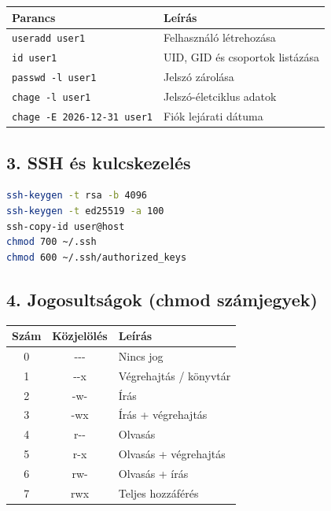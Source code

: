\documentclass[12pt,a4paper]{article}
\begin{document}
\begin{table}[H]
  \centering
  \small
  \begin{tabular}{|l|l|}
    \hline
    \textbf{Parancs} & \textbf{Leírás} \\
    \hline
    \texttt{useradd user1} & Felhasználó létrehozása \\\hline
    \texttt{id user1} & UID, GID és csoportok listázása \\\hline
    \texttt{passwd -l user1} & Jelszó zárolása \\\hline
    \texttt{chage -l user1} & Jelszó-életciklus adatok \\\hline
    \texttt{chage -E 2026-12-31 user1} & Fiók lejárati dátuma \\\hline
  \end{tabular}
\end{table}

\subsection{3. SSH és kulcskezelés}

\begin{lstlisting}[language=bash,caption={SSH kulcskezelés}]
ssh-keygen -t rsa -b 4096
ssh-keygen -t ed25519 -a 100
ssh-copy-id user@host
chmod 700 ~/.ssh
chmod 600 ~/.ssh/authorized_keys
\end{lstlisting}

\subsection{4. Jogosultságok (chmod számjegyek)}

\begin{table}[H]
  \centering
  \begin{tabular}{|c|c|l|}
    \hline
    \textbf{Szám} & \textbf{Közjelölés} & \textbf{Leírás} \\
    \hline
    0 & {-}{-}{-} & Nincs jog \\
    1 & {-}{-}x & Végrehajtás / könyvtár \\
    2 & {-}w{-} & Írás \\
    3 & {-}wx & Írás + végrehajtás \\
    4 & r{-}{-} & Olvasás \\
    5 & r{-}x & Olvasás + végrehajtás \\
    6 & rw{-} & Olvasás + írás \\
    7 & rwx & Teljes hozzáférés \\
    \hline
  \end{tabular}
\end{table}
\end{document}
